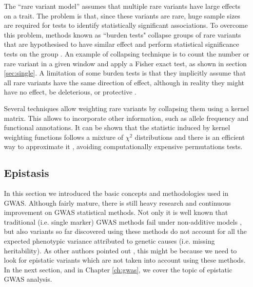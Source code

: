 The ``rare variant model'' assumes that multiple rare variants have large effects on a trait. The problem is that, since these variants are rare, huge sample sizes are required for tests to identify statistically significant associations. To overcome this problem, methods known as ``burden tests" collapse groups of rare variants that are hypothesised to have  similar effect and perform statistical significance tests on the group \cite{li2008methods}. An example of collapsing technique is to count the number or rare variant in a given window and apply a Fisher exact test, as shown in section \ref{sec:single}. A limitation of some burden tests is that they implicitly assume that all rare variants have the same direction of effect, although in reality they might have no effect, be deleterious, or protective \cite{li2008methods,wu2011rare}.

Several techniques allow weighting rare variants by collapsing them using a kernel matrix. This allows to incorporate other information, such as allele frequency and functional annotations. It can be shown that the statistic induced by kernel weighting functions follows a mixture of $\chi^2$ distributions and there is an efficient way to approximate it \cite{li2008methods,wu2011rare}, avoiding computationally expensive permutations tests.

\subsection{Epistasis \label{sec:epi}}

In this section we introduced the basic concepts and methodologies used in GWAS. Although fairly mature, there is still heavy research and continuous improvement on GWAS statistical methods. Not only it is well known that traditional (i.e. single marker) GWAS methods fail under non-additive models \cite{culverhouse2002perspective}, but also variants so far discovered using these methods do not account for all the expected phenotypic variance attributed to genetic causes (i.e. missing heritability). As other authors pointed out \cite{cordell2009detecting, zuk2012mystery, zuk2014searching}, this might be because we need to look for epistatic variants which are not taken into account using these methods. In the next section, and in Chapter \ref{ch:gwas}, we cover the topic of epistatic GWAS analysis.

